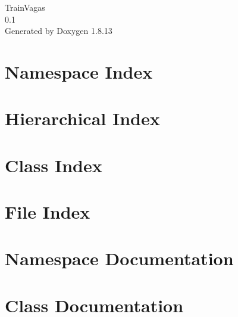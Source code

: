\documentclass[twoside]{book}
\newcommand{\+}{\discretionary{\mbox{\scriptsize$\hookleftarrow$}}{}{}}
\newcommand{\clearemptydoublepage}{%
  \newpage{\pagestyle{empty}\cleardoublepage}%
}
\begin{document}
\hypersetup{pageanchor=false,
             bookmarksnumbered=true,
             pdfencoding=unicode
            }
\begin{titlepage}
\vspace*{7cm}
\begin{center}%
{\Large Train\+Vagas \\[1ex]\large 0.\+1 }\\
\vspace*{1cm}
{\large Generated by Doxygen 1.8.13}\\
\end{center}
\end{titlepage}
\clearemptydoublepage
{}
\tableofcontents
\clearemptydoublepage
{}
\hypersetup{pageanchor=true}

\chapter{Namespace Index}

\chapter{Hierarchical Index}

\chapter{Class Index}

\chapter{File Index}

\chapter{Namespace Documentation}







\chapter{Class Documentation}
























\end{document}
